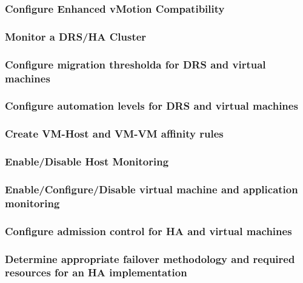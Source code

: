 \subsubsection{Configure Enhanced vMotion Compatibility}

\subsubsection{Monitor a DRS/HA Cluster}

\subsubsection{Configure migration thresholda for DRS and virtual machines}

\subsubsection{Configure automation levels for DRS and virtual machines}

\subsubsection{Create VM-Host and VM-VM affinity rules}

\subsubsection{Enable/Disable Host Monitoring}

\subsubsection{Enable/Configure/Disable virtual machine and application monitoring}

\subsubsection{Configure admission control for HA and virtual machines}

\subsubsection{Determine appropriate failover methodology and required resources for an HA implementation}
